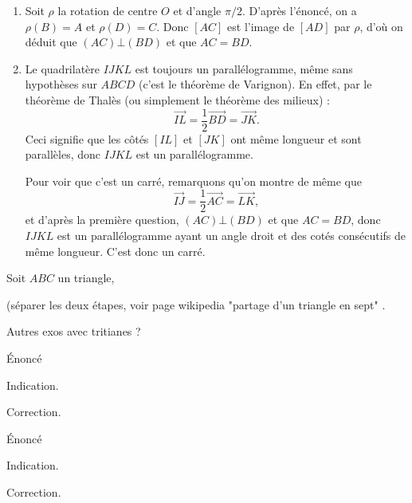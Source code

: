\begin{exo}
\begin{sol}
\begin{enumerate}
\item Soit $\rho$ la rotation de centre $O$ et d'angle $\pi/2$. D'après l'énoncé, on a $\rho(B)=A$ et $\rho(D)=C$. Donc $[AC]$ est l'image de $[AD]$ par $\rho$, d'où on déduit que $(AC)\bot (BD)$ et que $AC=BD$.

\item Le quadrilatère $IJKL$ est toujours un parallélogramme, même sans hypothèses sur $ABCD$ (c'est le théorème de Varignon). En effet, par le théorème de Thalès (ou simplement le théorème des milieux) : 
\[ \overrightarrow{IL} = \frac12 \overrightarrow{BD} = \overrightarrow{JK}.\]
Ceci signifie que les côtés $[IL]$ et $[JK]$ ont même longueur et sont parallèles, donc $IJKL$ est un parallélogramme.

Pour voir que c'est un carré, remarquons qu'on montre de même que  
\[ \overrightarrow{IJ} = \frac12 \overrightarrow{AC} = \overrightarrow{LK},\]
et d'après la première question, $(AC)\bot (BD)$ et que $AC=BD$, donc $IJKL$ est un parallélogramme ayant un angle droit et des cotés consécutifs de même longueur. C'est donc un carré.
\end{enumerate}
\end{sol}
\end{exo}


\begin{exo}

Soit $ABC$ un triangle, 


(séparer les deux étapes, voir page wikipedia "partage d'un triangle en sept" .

Autres exos avec tritianes ?
\end{exo}



\begin{exo}
Énoncé
\begin{hint}
Indication.
\end{hint}
\begin{sol}
Correction.
\end{sol}
\end{exo}

\begin{exo}
Énoncé
\begin{hint}
Indication.
\end{hint}
\begin{sol}
Correction.
\end{sol}
\end{exo}


